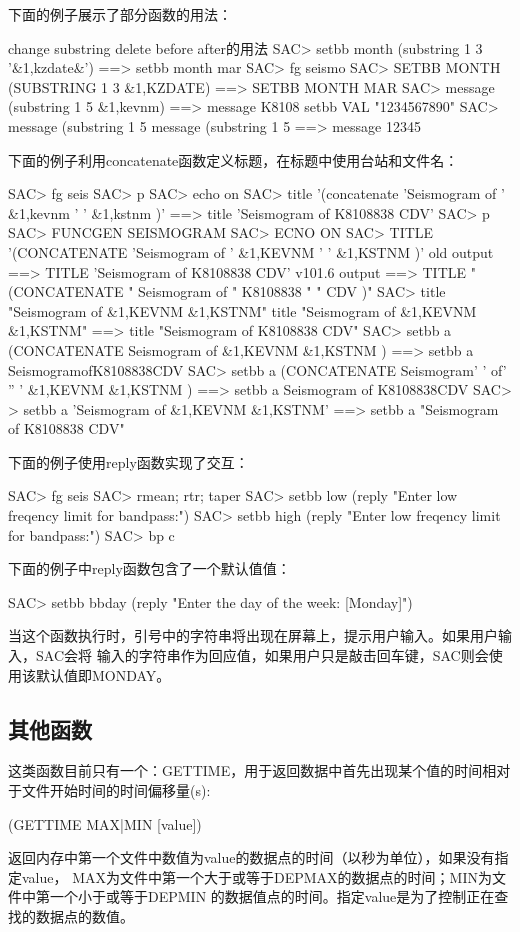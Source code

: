 下面的例子展示了部分函数的用法：
\begin{SACCode}
change substring delete before after的用法
SAC> setbb month (substring 1 3 '&1,kzdate&')
 ==> setbb month mar
SAC> fg seismo
SAC> SETBB MONTH (SUBSTRING 1 3 &1,KZDATE)
==>  SETBB MONTH MAR
SAC> message (substring 1 5 &1,kevnm)
==>  message K8108
setbb VAL "1234567890"
SAC> message (substring 1 5 %
message (substring 1 5 %
==>  message 12345
\end{SACCode}

下面的例子利用concatenate函数定义标题，在标题中使用台站和文件名：
\begin{SACCode}
SAC> fg seis
SAC> p
SAC> echo on
SAC> title '(concatenate 'Seismogram of ' &1,kevnm ' ' &1,kstnm )'
 ==> title 'Seismogram of K8108838 CDV'
SAC> p
SAC> FUNCGEN SEISMOGRAM
SAC> ECNO ON
SAC> TITLE '(CONCATENATE 'Seismogram of ' &1,KEVNM ' ' &1,KSTNM )'
old output  ==> TITLE 'Seismogram of K8108838 CDV'
v101.6 output  ==>  TITLE "(CONCATENATE " Seismogram of " K8108838 " " CDV )"
SAC> title "Seismogram of &1,KEVNM &1,KSTNM"
title "Seismogram of &1,KEVNM &1,KSTNM"
==>  title "Seismogram of K8108838 CDV"
SAC> setbb a (CONCATENATE Seismogram of  &1,KEVNM  &1,KSTNM )
==>  setbb a SeismogramofK8108838CDV
SAC> setbb a (CONCATENATE Seismogram' ' of' '' '  &1,KEVNM  &1,KSTNM )
==>  setbb a Seismogram of  K8108838CDV
SAC> > setbb a 'Seismogram of  &1,KEVNM  &1,KSTNM'
==>  setbb a "Seismogram of  K8108838  CDV"
\end{SACCode}

下面的例子使用reply函数实现了交互：
\begin{SACCode}
SAC> fg seis
SAC> rmean; rtr; taper
SAC> setbb low (reply "Enter low freqency limit for bandpass:")
SAC> setbb high (reply "Enter low freqency limit for bandpass:")
SAC> bp c %
\end{SACCode}

下面的例子中reply函数包含了一个默认值值：
\begin{SACCode}
SAC> setbb bbday (reply "Enter the day of the week: [Monday]") 
\end{SACCode}
当这个函数执行时，引号中的字符串将出现在屏幕上，提示用户输入。如果用户输入，SAC会将
输入的字符串作为回应值，如果用户只是敲击回车键，SAC则会使用该默认值即MONDAY。

\subsection{其他函数}
这类函数目前只有一个：GETTIME，用于返回数据中首先出现某个值的时间相对于文件开始时间的时间偏移量(s):
\begin{SACCode}
   (GETTIME MAX|MIN [value])
\end{SACCode}
返回内存中第一个文件中数值为value的数据点的时间（以秒为单位），如果没有指定value，
MAX为文件中第一个大于或等于DEPMAX的数据点的时间；MIN为文件中第一个小于或等于DEPMIN
的数据值点的时间。指定value是为了控制正在查找的数据点的数值。

